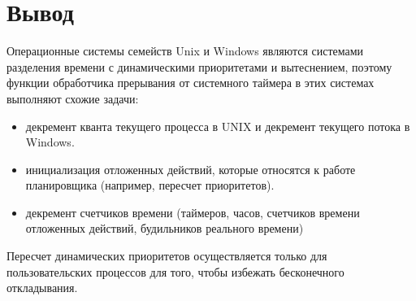 
\chapter{Вывод}

Операционные системы семейств Unix и Windows являются системами разделения времени с динамическими приоритетами и вытеснением, поэтому функции обработчика прерывания от системного таймера в этих системах выполняют схожие задачи:

\begin{itemize}
	\item декремент кванта текущего процесса в UNIX и декремент текущего потока в Windows.
	\item инициализация отложенных действий, которые относятся к работе планировщика (например, пересчет приоритетов).
	\item декремент счетчиков времени (таймеров, часов, счетчиков времени отложенных действий, будильников реального времени) 
\end{itemize}

Пересчет динамических приоритетов осуществляется только для пользовательских процессов для того, чтобы избежать бесконечного откладывания.